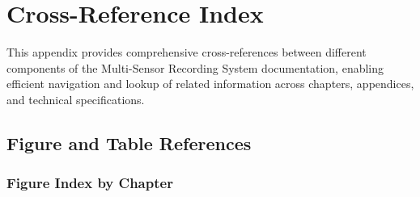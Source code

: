 \section{Cross-Reference Index}

This appendix provides comprehensive cross-references between different components of the Multi-Sensor Recording System documentation, enabling efficient navigation and lookup of related information across chapters, appendices, and technical specifications.

\subsection{Figure and Table References}

\subsubsection{Figure Index by Chapter}

